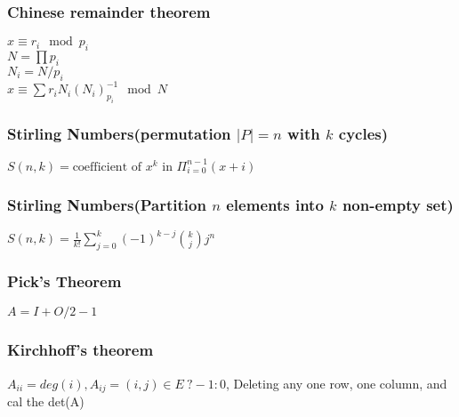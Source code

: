 \subsubsection{Chinese remainder theorem}
	$x \equiv r_i \mod p_i $\\
	$N = \prod p_i$\\
	$N_i = N / p_i$\\
	$x \equiv \sum r_i N_i (N_i)^{-1}_{p_i} \mod N$
\subsubsection{Stirling Numbers(permutation $|P|=n$ with $k$ cycles)}
	$S(n,k) = \text{coefficient of }x^k \text{ in } \Pi_{i=0}^{n-1} (x+i)$
\subsubsection{Stirling Numbers(Partition $n$ elements into $k$ non-empty set)}
	$S(n,k) = \frac{1}{k!} \sum\limits_{j=0}^k (-1)^{k-j} {k \choose j} j^n$
\subsubsection{Pick’s Theorem}
	$A = I + O/2 - 1$
\subsubsection{Kirchhoff's theorem}
 	$A_{ii} = deg(i), A_{ij} = (i,j) \in E\ ? -1 : 0$, Deleting any one row, one column, and cal the det(A)
